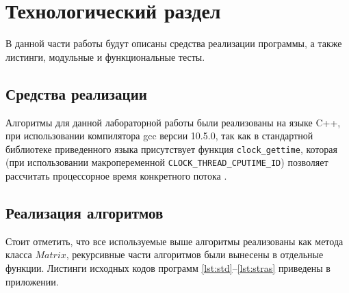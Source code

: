 \chapter{Технологический раздел}

В данной части работы будут описаны средства реализации программы, а также листинги, модульные и функциональные тесты.

\section{Средства реализации}
Алгоритмы для данной лабораторной работы были реализованы на языке C++, при использовании компилятора gcc версии 10.5.0, так как в стандартной библиотеке приведенного языка
присутствует функция \texttt{clock\_gettime}, которая (при использовании макропеременной \texttt{CLOCK\_THREAD\_CPUTIME\_ID}) позволяет рассчитать процессорное время конкретного потока \cite{cpp-time}.



\section{Реализация алгоритмов}

Стоит отметить, что все используемые выше алгоритмы реализованы как метода класса $Matrix$, рекурсивные части алгоритмов были вынесены в отдельные функции.
Листинги исходных кодов программ  \ref{lst:std}--\ref{lst:stras} приведены в приложении.

